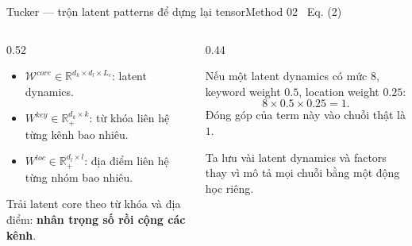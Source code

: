 \documentclass[aspectratio=169,11pt]{beamer}
\begin{document}
\begin{frame}[shrink=34]{Tucker --- trộn latent patterns để dựng lại tensor}{Method 02 \textperiodcentered\ Eq. (2)}
\vspace{3mm}
\begin{columns}[T,onlytextwidth]
\begin{column}{0.52\textwidth}
\begin{mathcard}
  \begin{itemize}
    \item $\mathcal W^{core}\in\mathbb R^{d_k\times d_l\times L_c}$: latent dynamics.
    \item $W^{key}\in\mathbb R_+^{d_k\times k}$: từ khóa liên hệ từng kênh bao nhiêu.
    \item $W^{loc}\in\mathbb R_+^{d_l\times l}$: địa điểm liên hệ từng nhóm bao nhiêu.
  \end{itemize}
\end{mathcard}
\vspace{3mm}
\begin{takeaway}
  Trải latent core theo từ khóa và địa điểm: \textbf{nhân trọng số rồi cộng các kênh}.
\end{takeaway}
\end{column}
\begin{column}{0.44\textwidth}
\begin{intuition}
  Nếu một latent dynamics có mức $8$, keyword weight $0.5$, location weight $0.25$:
  \[8\times0.5\times0.25=1.\]
  Đóng góp của term này vào chuỗi thật là $1$.
\end{intuition}
\vspace{3mm}
\begin{questioncard}
  \par
  Ta lưu vài latent dynamics và factors thay vì mô tả mọi chuỗi bằng một động học riêng.
\end{questioncard}
\end{column}
\end{columns}
\vspace{2mm}
\end{frame}
\end{document}
